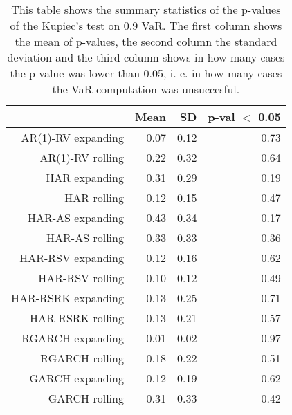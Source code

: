 \begin{table}[ht]
\centering
\begin{tabular}{rrrr}
  \hline
 & Mean & SD & p-val $<$ 0.05 \\ 
  \hline
AR(1)-RV expanding & 0.07 & 0.12 & 0.73 \\ 
  AR(1)-RV rolling & 0.22 & 0.32 & 0.64 \\ 
  HAR expanding & 0.31 & 0.29 & 0.19 \\ 
  HAR rolling & 0.12 & 0.15 & 0.47 \\ 
  HAR-AS expanding & 0.43 & 0.34 & 0.17 \\ 
  HAR-AS rolling & 0.33 & 0.33 & 0.36 \\ 
  HAR-RSV expanding & 0.12 & 0.16 & 0.62 \\ 
  HAR-RSV rolling & 0.10 & 0.12 & 0.49 \\ 
  HAR-RSRK expanding & 0.13 & 0.25 & 0.71 \\ 
  HAR-RSRK rolling & 0.13 & 0.21 & 0.57 \\ 
  RGARCH expanding & 0.01 & 0.02 & 0.97 \\ 
  RGARCH rolling & 0.18 & 0.22 & 0.51 \\ 
  GARCH expanding & 0.12 & 0.19 & 0.62 \\ 
  GARCH rolling & 0.31 & 0.33 & 0.42 \\ 
   \hline
\end{tabular}
\caption[Kupiec's test p-values summary, alpha =0.9]{This table shows the summary statistics of the p-values of the Kupiec's test on 0.9 VaR. 
            The first column shows the mean of p-values, the second column the standard deviation 
            and the third column shows in how many cases the p-value was lower than 0.05, i. e. in how many cases the VaR computation was unsuccesful.} 
\label{Table:Kupiec_test_summary_0.9}
\end{table}

